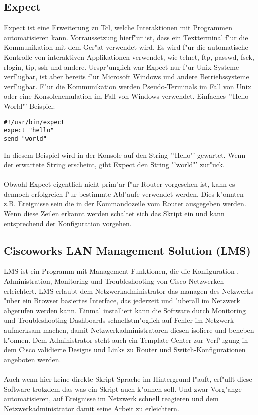 \documentclass[a4paper,12pt]{scrreprt}
\begin{document}
\subsection{Expect}
Expect ist eine Erweiterung zu Tcl, welche Interaktionen mit Programmen automatisieren kann. Vorraussetzung hierf"ur ist, dass ein Textterminal f"ur die Kommunikation mit dem Ger"at verwendet wird. Es wird f"ur die automatische Kontrolle von interaktiven Applikationen verwendet, wie telnet, ftp, passwd, fsck, rlogin, tip, ssh und andere. Urspr"unglich war Expect nur f"ur Unix Systeme verf"ugbar, ist aber bereits f"ur Microsoft Windows und andere Betriebssysteme verf"ugbar. F"ur die Kommunikation werden Pseudo-Terminals im Fall von Unix oder eine Konsolenemulation im Fall von Windows verwendet.\newpage
Einfaches "'Hello World"' Beispiel:
\begin{lstlisting}
#!/usr/bin/expect
expect "hello"
send "world"
\end{lstlisting}
In diesem Beispiel wird in der Konsole auf den String "'Hello"' gewartet. Wenn der erwartete String erscheint, gibt Expect den String "'world"' zur"uck. \\\\Obwohl Expect eigentlich nicht prim"ar f"ur Router vorgesehen ist, kann es dennoch erfolgreich f"ur bestimmte Abl"aufe verwendet werden. Dies k"onnten z.B. Ereignisse sein die in der Kommandozeile vom Router ausgegeben werden. Wenn diese Zeilen erkannt werden schaltet sich das Skript ein und kann entsprechend der Konfiguration vorgehen. \cite{exp1}
\subsection{Ciscoworks LAN Management Solution (LMS)}
LMS ist ein Programm mit Management Funktionen, die die Konfiguration , Administration, Monitoring und Troubleshooting von Cisco Netzwerken erleichtert. LMS erlaubt dem Netzwerkadministrator das managen des Netzwerks "uber ein Browser basiertes Interface, das jederzeit und "uberall im Netzwerk abgerufen werden kann. Einmal installiert kann die Software durch Monitoring und Troubleshooting Dashboards schnellstm"oglich auf Fehler im Netzwerk aufmerksam machen, damit Netzwerkadministratoren diesen isoliere und beheben k"onnen. Dem Administrator steht auch ein Template Center zur Verf"ugung in dem Cisco validierte Designs und Links zu Router und Switch-Konfigurationen angeboten werden. \cite{cisc1}\\\\
Auch wenn hier keine direkte Skript-Sprache im Hintergrund l"auft, erf"ullt diese Software trotzdem das was ein Skript auch k"onnen soll. Und zwar Vorg"ange automatisieren, auf Ereignisse im Netzwerk schnell reagieren und dem Netzwerkadministrator damit seine Arbeit zu erleichtern.
\end{document}
